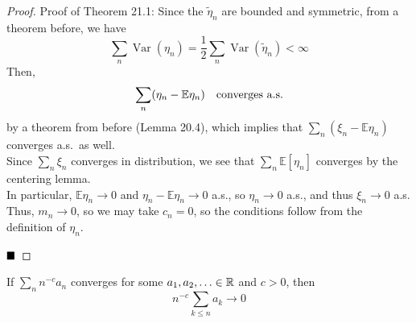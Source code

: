 \begin{proof}{Proof of Theorem 21.1:}
    Since the $\tilde{\eta}_n$ are bounded and symmetric, from a theorem before, we have
    \[ \sum_n \operatorname{Var}(\eta_n) = \frac{1}{2}\sum_n \operatorname{Var}(\tilde{\eta}_n) < \infty \]
    Then,
    \[ \sum_n(\eta_n - \mathbb{E}\eta_n) \quad \tt{converges a.s.} \]
    by a theorem from before (Lemma 20.4), which implies that $\sum_n(\xi_n - \mathbb{E}\eta_n)$ converges a.s.\ as well.\\

    Since $\sum_n \xi_n$ converges in distribution, we see that $\sum_n \mathbb{E}[\eta_n]$ converges by the centering lemma.\\

    In particular, $\mathbb{E}\eta_n \to 0$ and $\eta_n - \mathbb{E}\eta_n \to 0$ a.s., so $\eta_n \to 0$ a.s., and thus $\xi_n \to 0$ a.s. Thus, $m_n \to 0$, so we may take $c_n = 0$, so the conditions follow from the definition of $\eta_n$.

    $\qed$
\end{proof}

\begin{lemma}
    If $\sum_n n^{-c}a_n$ converges for some $a_1, a_2, \ldots \in \R$ and $c > 0$, then
    \[ n^{-c}\sum_{k \leq n} a_k \to 0 \]
\end{lemma}
